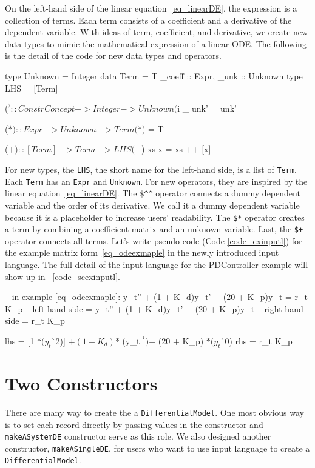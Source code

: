 On the left-hand side of the linear equation~\ref{eq_linearDE}, the expression is a collection of terms. Each term consists of a coefficient and a derivative of the dependent variable. With ideas of term, coefficient, and derivative, we create new data types to mimic the mathematical expression of a linear ODE. The following is the detail of the code for new data types and operators.

\begin{haskell1}
type Unknown = Integer
data Term = T{
	_coeff :: Expr,
	_unk :: Unknown
}
type LHS = [Term]

($^^) :: ConstrConcept -> Integer -> Unknown
($^^) _ unk' = unk'

($*) :: Expr -> Unknown -> Term
($*) = T

($+) :: [Term] -> Term -> LHS
($+) xs x  = xs ++ [x]
\end{haskell1}

For new types, the \verb|LHS|, the short name for the left-hand side, is a list of \verb|Term|. Each \verb|Term| has an \verb|Expr| and \verb|Unknown|. For new operators, they are inspired by the linear equation~\ref{eq_linearDE}. The \verb|$^^| operator connects a dummy dependent variable and the order of its derivative. We call it a dummy dependent variable because it is a placeholder to increase users' readability. The \verb|$*| operator creates a term by combining a coefficient matrix and an unknown variable. Last, the \verb|$+| operator connects all terms. Let's write pseudo code (Code \ref{code_exinputl}) for the example matrix form~\ref{eq_odeexmaple} in the newly introduced input language. The full detail of the input language for the PDController example will show up in ~\ref{code_scexinputl}.

\begin{listing}
\begin{haskell1}
-- in example \ref{eq_odeexmaple}: y\_t'' + (1 + K\_d)y\_t' + (20 + K\_p)y\_t = r\_t K\_p
-- left hand side = y\_t'' + (1 + K\_d)y\_t' + (20 + K\_p)y\_t 
-- right hand side = r\_t K\_p

lhs = [1 $* (y_t $^^ 2)]
	$+ (1 + K_d) $* (y_t $^^ 1)
	$+ (20 + K_p) $* (y_t $^^ 0)
rhs = r_t K_p
\end{haskell1}
\label{code_exinputl}
\end{listing}

\section{Two Constructors}
There are many way to create the a \verb|DifferentialModel|. One most obvious way is to set each record directly by passing values in the constructor and \verb|makeASystemDE| constructor serve as this role. We also designed another constructor, \verb|makeASingleDE|, for users who want to use input language to create a \verb|DifferentialModel|.

